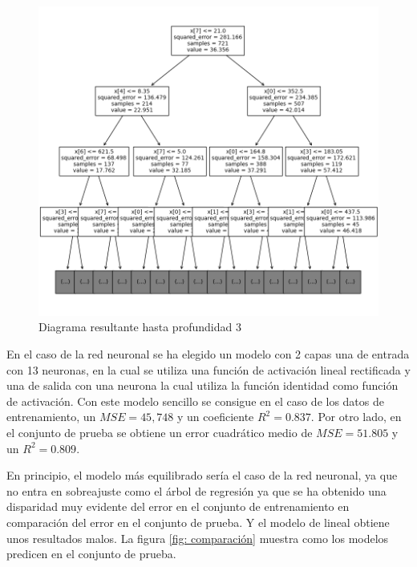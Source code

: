 \begin{figure}[h]
  \centering
  \includegraphics[scale=0.3]{Documentos Extra/Imagenes/Arbol.png}
  \caption{Diagrama resultante hasta profundidad 3}
  \label{fig:diagrama arbol}
\end{figure}
  

\noindent En el caso de la red neuronal se ha elegido un modelo con 2 capas una de entrada con 13 neuronas, en la cual se utiliza una función de activación lineal rectificada y una de salida con una neurona la cual utiliza la función identidad como función de activación. Con este modelo sencillo se consigue en el caso de los datos de entrenamiento, un $MSE=45,748$ y un coeficiente $R^2=0.837$. Por otro lado, en el conjunto de prueba se obtiene un error cuadrático medio de $MSE=51.805$ y un $R^2=0.809$.

\noindent En principio, el modelo más equilibrado sería el caso de la red neuronal, ya que no entra en sobreajuste como el árbol de regresión ya que se ha obtenido una disparidad muy evidente del error en el conjunto de entrenamiento en comparación del error en el conjunto de prueba. Y el modelo de lineal obtiene unos resultados malos. La figura \ref{fig: comparación} muestra como los modelos predicen en el conjunto de prueba.


